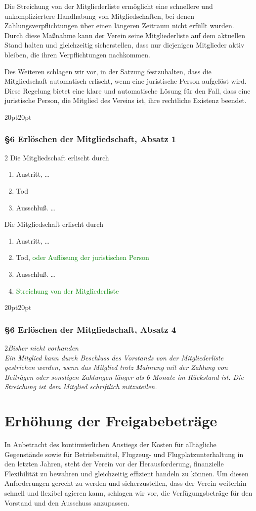 \documentclass[10pt,a4paper,parskip=half]{scrartcl}
\newcommand{\new}[1]{\textcolor{Green}{#1}}
\newcommand{\change}[1]{
  \begin{adjustwidth}{20pt}{20pt}
    #1
  \end{adjustwidth}
}
\newcommand{\compare}[3]{\change{\subsubsection*{#1}\begin{multicols}{2}#2\columnbreak\\#3\end{multicols}}}
\begin{document}
Die Streichung von der Mitgliederliste ermöglicht eine schnellere und unkompliziertere Handhabung von Mitgliedschaften, bei denen Zahlungsverpflichtungen über einen längeren Zeitraum nicht erfüllt wurden. Durch diese Maßnahme kann der Verein seine Mitgliederliste auf dem aktuellen Stand halten und gleichzeitig sicherstellen, dass nur diejenigen Mitglieder aktiv bleiben, die ihren Verpflichtungen nachkommen.

Des Weiteren schlagen wir vor, in der Satzung festzuhalten, dass die Mitgliedschaft automatisch erlischt, wenn eine juristische Person aufgelöst wird. Diese Regelung bietet eine klare und automatische Lösung für den Fall, dass eine juristische Person, die Mitglied des Vereins ist, ihre rechtliche Existenz beendet.

\change{
  \subsubsection*{§6 Erlöschen der Mitgliedschaft, Absatz 1}
  \begin{multicols}{2}
    Die Mitgliedschaft erlischt durch
    \begin{enumerate}[label=\alph*)]
      \item Austritt, \dots
      \item Tod
      \item{Ausschluß.} \dots
    \end{enumerate}
    \columnbreak
    Die Mitgliedschaft erlischt durch
    \begin{enumerate}[label=\alph*)]
      \item Austritt, \dots
      \item Tod, \new{oder Auflösung der juristischen Person}
      \item{Ausschluß.} \dots
      \item \new{Streichung von der Mitgliederliste}
    \end{enumerate}
  \end{multicols}
}
\compare{§6 Erlöschen der Mitgliedschaft, Absatz 4}{\em Bisher nicht vorhanden \em}{Ein Mitglied kann durch Beschluss des Vorstands von der Mitgliederliste gestrichen werden,
  wenn das Mitglied trotz Mahnung mit der Zahlung von Beiträgen oder sonstigen Zahlungen länger als 6 Monate im Rückstand ist.
  Die Streichung ist dem Mitglied schriftlich mitzuteilen.}

\clearpage
\section{Erhöhung der Freigabebeträge}
In Anbetracht des kontinuierlichen Anstiegs der Kosten für alltägliche Gegenstände sowie für Betriebsmittel, Flugzeug- und Flugplatzunterhaltung in den letzten Jahren, steht der Verein vor der Herausforderung, finanzielle Flexibilität zu bewahren und gleichzeitig effizient handeln zu können. Um diesen Anforderungen gerecht zu werden und sicherzustellen, dass der Verein weiterhin schnell und flexibel agieren kann, schlagen wir vor, die Verfügungsbeträge für den Vorstand und den Ausschuss anzupassen.
\end{document}
